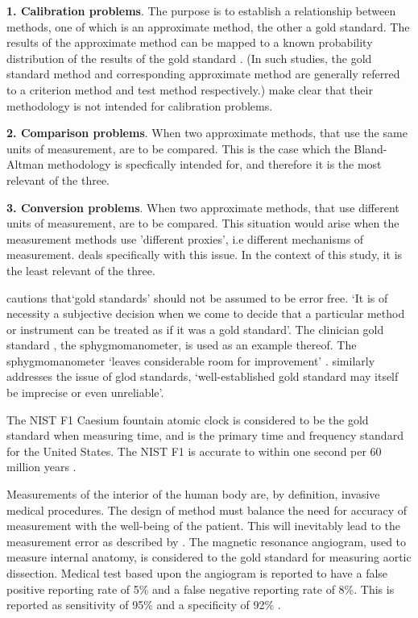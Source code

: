 \documentclass[12pt, a4paper]{report}
\theoremstyle{plain}
\theoremstyle{definition}
\theoremstyle{remark}
\begin{document}
	
	\textbf{1. Calibration problems}. The purpose is to establish a
	relationship between methods, one of which is an approximate
	method, the other a gold standard. The results of the approximate
	method can be mapped to a known probability distribution of the
	results of the gold standard \citep{lewis}. (In such studies, the
	gold standard method and corresponding approximate method are
	generally referred to a criterion method and test method
	respectively.) \citet*{BA83} make clear that their methodology is
	not intended for calibration problems.
	
	\bigskip \textbf{2. Comparison problems}. When two approximate
	methods, that use the same units of measurement, are to be
	compared. This is the case which the Bland-Altman methodology is
	specfically intended for, and therefore it is the most relevant of
	the three.
	
	\bigskip \textbf{3. Conversion problems}. When two approximate
	methods, that use different units of measurement, are to be
	compared. This situation would arise when the measurement methods
	use 'different proxies', i.e different mechanisms of measurement.
	\citet{lewis} deals specifically with this issue. In the context
	of this study, it is the least relevant of the three.
	
	\citet[p.47]{DunnSEME} cautions that`gold standards' should not be
	assumed to be error free. `It is of necessity a subjective
	decision when we come to decide that a particular method or
	instrument can be treated as if it was a gold standard'. The
	clinician gold standard , the sphygmomanometer, is used as an
	example thereof.  The sphygmomanometer `leaves considerable room
	for improvement' \citep{DunnSEME}. \citet{pizzi} similarly
	addresses the issue of glod standards, `well-established gold
	standard may itself be imprecise or even unreliable'.
	
	
	The NIST F1 Caesium fountain atomic clock is considered to be the
	gold standard when measuring time, and is the primary time and
	frequency standard for the United States. The NIST F1 is accurate
	to within one second per 60 million years \citep{NIST}.
	
	Measurements of the interior of the human body are, by definition,
	invasive medical procedures. The design of method must balance the
	need for accuracy of measurement with the well-being of the
	patient. This will inevitably lead to the measurement error as
	described by \citet{DunnSEME}. The magnetic resonance angiogram,
	used to measure internal anatomy,  is considered to the gold
	standard for measuring aortic dissection. Medical test based upon
	the angiogram is reported to have a false positive reporting rate
	of 5\% and a false negative reporting rate of 8\%. This is
	reported as sensitivity of 95\% and a specificity of 92\%
	\citep{ACR}.
	
\end{document}
